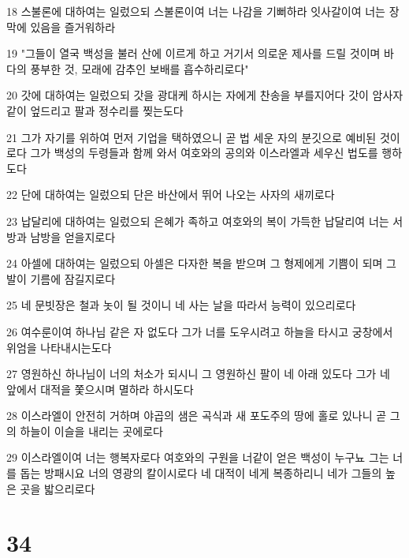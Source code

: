 \par 18 스불론에 대하여는 일렀으되 스불론이여 너는 나감을 기뻐하라 잇사갈이여 너는 장막에 있음을 즐거워하라
\par 19 "그들이 열국 백성을 불러 산에 이르게 하고 거기서 의로운 제사를 드릴 것이며 바다의 풍부한 것, 모래에 감추인 보배를 흡수하리로다"
\par 20 갓에 대하여는 일렀으되 갓을 광대케 하시는 자에게 찬송을 부를지어다 갓이 암사자같이 엎드리고 팔과 정수리를 찢는도다
\par 21 그가 자기를 위하여 먼저 기업을 택하였으니 곧 법 세운 자의 분깃으로 예비된 것이로다 그가 백성의 두령들과 함께 와서 여호와의 공의와 이스라엘과 세우신 법도를 행하도다
\par 22 단에 대하여는 일렀으되 단은 바산에서 뛰어 나오는 사자의 새끼로다
\par 23 납달리에 대하여는 일렀으되 은혜가 족하고 여호와의 복이 가득한 납달리여 너는 서방과 남방을 얻을지로다
\par 24 아셀에 대하여는 일렀으되 아셀은 다자한 복을 받으며 그 형제에게 기쁨이 되며 그 발이 기름에 잠길지로다
\par 25 네 문빗장은 철과 놋이 될 것이니 네 사는 날을 따라서 능력이 있으리로다
\par 26 여수룬이여 하나님 같은 자 없도다 그가 너를 도우시려고 하늘을 타시고 궁창에서 위엄을 나타내시는도다
\par 27 영원하신 하나님이 너의 처소가 되시니 그 영원하신 팔이 네 아래 있도다 그가 네 앞에서 대적을 쫓으시며 멸하라 하시도다
\par 28 이스라엘이 안전히 거하며 야곱의 샘은 곡식과 새 포도주의 땅에 홀로 있나니 곧 그의 하늘이 이슬을 내리는 곳에로다
\par 29 이스라엘이여 너는 행복자로다 여호와의 구원을 너같이 얻은 백성이 누구뇨 그는 너를 돕는 방패시요 너의 영광의 칼이시로다 네 대적이 네게 복종하리니 네가 그들의 높은 곳을 밟으리로다

\chapter{34}

